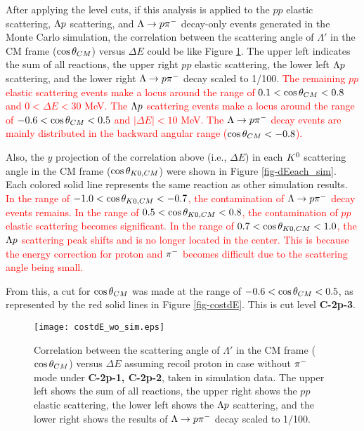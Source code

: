 After applying the  level cuts, if this analysis is applied to the $pp$ elastic scattering, $\Lambda p$ scattering, and $\Lambda\to p\pi^{-}$ decay-only events generated in the Monte Carlo simulation, the correlation between the scattering angle of $\Lambda'$ in the CM frame ($\cos{\theta}_{CM}$) versus $\Delta E$ could be like Figure \ref{fig-costdE_sim}. The upper left indicates the sum of all reactions, the upper right $pp$ elastic scattering, the lower left $\Lambda p$ scattering, and the lower right $\Lambda\to p\pi^{-}$ decay scaled to 1/100. \textcolor{red}{ The remaining $pp$ elastic scattering events make a locus around the range of $0.1<\cos{\theta}_{CM}<0.8$ and $0<\Delta E<30$ MeV. The $\Lambda p$ scattering events make a locus around the range of $-0.6<\cos{\theta}_{CM}<0.5$ and $|\Delta E|<10$ MeV. The $\Lambda\to p\pi^{-}$ decay events are mainly distributed in the backward angular range ($\cos{\theta}_{CM}<-0.8$). }

Also, the $y$ projection of the correlation above (i.e., $\Delta E$) in each $K^{0}$ scattering angle in the CM frame ($\cos{\theta_{K0,CM}}$) were shown in Figure \ref{fig-dEeach_sim}. 
Each colored solid line represents the same reaction as other simulation results.
\textcolor{red}{ In the range of $-1.0<\cos{\theta_{K0,CM}}<-0.7$, the contamination of $\Lambda\to p\pi^{-}$ decay events remains. In the range of $0.5<\cos{\theta_{K0,CM}}<0.8$, the contamination of $pp$ elastic scattering becomes significant. In the range of $0.7<\cos{\theta_{K0,CM}}<1.0$, the $\Lambda p$ scattering peak shifts and is no longer located in the center. This is because the energy correction for proton and $\pi^{-}$ becomes difficult due to the scattering angle being small. }

From this, a cut for $\cos{\theta}_{CM}$ was made at the range of $-0.6<\cos{\theta}_{CM}<0.5$, as represented by the red solid lines in Figure \ref{fig-costdE}. This is cut level {\bf C-2p-3}.

\begin{figure}[!h]
  \begin{center}
    \texttt{[image: costdE\_wo\_sim.eps]}
    \caption{Correlation between the scattering angle of $\Lambda'$ in the CM frame ($\cos{\theta}_{CM}$) versus $\Delta E$ assuming recoil proton in case  without $\pi^{-}$ mode under {\bf C-2p-1, C-2p-2}, taken in simulation data. The upper left shows the sum of all reactions, the upper right shows the $pp$ elastic scattering, the lower left shows the $\Lambda p$ scattering, and the lower right shows the results of $\Lambda\to p\pi^{-}$ decay scaled to 1/100.}
    \label{fig-costdE_sim}
  \end{center}
\end{figure}

